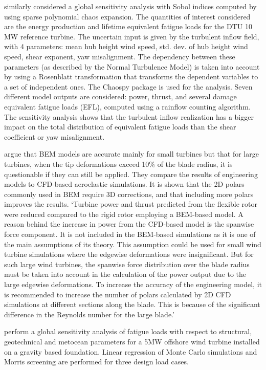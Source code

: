 \documentclass[review]{elsarticle}
\numberwithin{equation}{section}
\numberwithin{equation}{section}
\begin{document}
\cite{Murcia2018} similarly considered a global sensitivity analysis with Sobol indices computed by using sparse polynomial chaos expansion. The quantities of interest considered are the energy production and lifetime equivalent fatigue loads for the DTU 10 MW reference turbine. The uncertain input is given by the turbulent inflow field, with 4 parameters: mean hub height wind speed, std. dev. of hub height wind speed, shear exponent, yaw misalignment. The dependency between these parameters (as described by the Normal Turbulence Model) is taken into account by using a Rosenblatt transformation that transforms the dependent variables to a set of independent ones. The Chaospy package is used for the analysis. Seven different model outputs are considered: power, thrust, and several damage equivalent fatigue loads (EFL), computed using a rainflow counting algorithm. The sensitivity analysis shows that the turbulent inflow realization has a bigger impact on the total distribution of equivalent fatigue loads than the shear coefficient or yaw misalignment.

\cite{Sayed2019} argue that BEM models are accurate mainly for small turbines but that for large turbines, when the tip deformations exceed 10\% of the blade radius, it is questionable if they can still be applied. They compare the results of engineering models to CFD-based aeroelastic simulations. It is shown that the 2D polars commonly used in BEM require 3D corrections, and that including more polars improves the results. `Turbine power and thrust predicted from the flexible rotor were reduced compared to the rigid rotor employing a BEM-based model. A reason behind the increase in power from the CFD-based model is the spanwise force component. It is not included in the BEM-based simulations as it is one of the main assumptions of its theory. This assumption could be used for small wind turbine simulations where the edgewise deformations were insignificant. But for such large wind turbines, the spanwise force distribution over the blade radius must be taken into account in the calculation of the power output due to the large edgewise deformations. To increase the accuracy of the engineering model, it is recommended to increase the number of polars calculated by 2D CFD simulations at different sections along the blade. This is because of the significant difference in the Reynolds number for the large blade.'

\cite{Velarde2019} perform a global sensitivity analysis of fatigue loads with respect to structural, geotechnical and metocean parameters for a 5MW offshore wind turbine installed on a gravity based foundation. Linear regression of Monte Carlo simulations and Morris screening are performed for three design load cases. 
\end{document}
